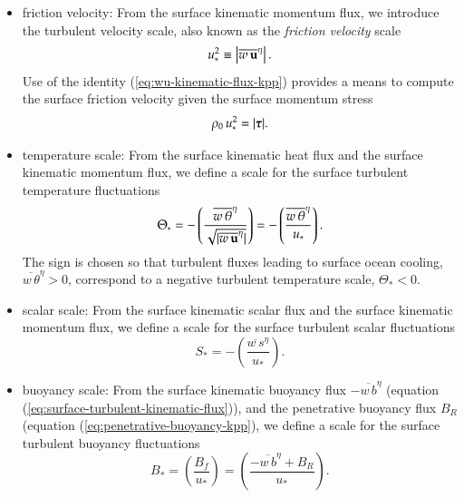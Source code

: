 \begin{itemize}

\item {\sc friction velocity}: From the surface kinematic momentum
  flux, we introduce the turbulent velocity scale, also known as the
  {\it friction velocity} scale
\begin{equation}
  u_{*}^{2} \equiv \left| \overline{w \, {\bf u}}^{\eta} \right|.
\label{eq:friction-velocity-defined}
\end{equation}
Use of the identity (\ref{eq:wu-kinematic-flux-kpp}) provides a means
to compute the surface friction velocity given the surface momentum
stress
\begin{equation}
  \rho_{0} \, u_{*}^{2} = | \mbox{\boldmath $\tau$} |.
\label{eq:friction-velocity}
\end{equation}

\item {\sc temperature scale}: From the surface kinematic heat flux
  and the surface kinematic momentum flux, we define a scale for the
  surface turbulent temperature fluctuations
\begin{equation}
  \Theta_{*} = 
  -\left( 
   \frac{\overline{w \, \theta}^{\eta}}{  \sqrt { |\overline{w \, {\bf u}}^{\eta} | } }
   \right)
 = 
  -\left( 
   \frac{\overline{w \, \theta}^{\eta}}{  u_{*}}  \right).
\label{eq:turbulent-temp-fluctuations}
\end{equation}
The sign is chosen so that turbulent fluxes leading to surface ocean
cooling, $\overline{w \, \theta}^{\eta} > 0$, correspond to a negative
turbulent temperature scale, $\Theta_{*} < 0$.

\item {\sc scalar scale}: From the surface kinematic scalar flux and
 the surface kinematic momentum flux, we define a scale for the
  surface turbulent scalar fluctuations
\begin{equation}
  S_{*} = 
  -\left( 
   \frac{\overline{w \, s}^{\eta}}{  u_{*}}  \right).
\label{eq:scalar-turbulent-scale-m-o}
\end{equation}

\item {\sc buoyancy scale}: From the surface kinematic buoyancy flux
  $-\overline{w \, b}^{\eta}$ (equation
  (\ref{eq:surface-turbulent-kinematic-flux})), and the penetrative
  buoyancy flux $B_{R}$ (equation (\ref{eq:penetrative-buoyancy-kpp}),
  we define a scale for the surface turbulent buoyancy fluctuations
\begin{equation}
  B_{*} = 
  \left( 
   \frac{B_{f} } {  u_{*} }
   \right)
 =
  \left( 
   \frac{-\overline{w \, b}^{\eta} + B_{R} } {  u_{*} }
   \right).
\label{eq:buoyancy-scale-defined}
\end{equation}

\end{itemize}


